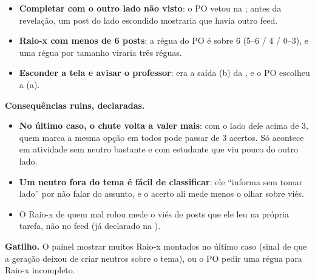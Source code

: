 \begin{itemize}
  \item \textbf{Completar com o outro lado não visto}: o PO vetou na
    ; antes da revelação, um post do lado escondido mostraria
    que havia outro feed.
  \item \textbf{Raio-x com menos de 6 posts}: a régua do PO é sobre 6
    (5--6 / 4 / 0--3), e uma régua por tamanho viraria três réguas.
  \item \textbf{Esconder a tela e avisar o professor}: era a saída (b) da
    , e o PO escolheu a (a).
\end{itemize}

\textbf{Consequências ruins, declaradas.}

\begin{itemize}
  \item \textbf{No último caso, o chute volta a valer mais}: com o lado dele
    acima de 3, quem marca a mesma opção em todos pode passar de 3 acertos.
    Só acontece em atividade sem neutro bastante e com estudante que viu
    pouco do outro lado.
  \item \textbf{Um neutro fora do tema é fácil de classificar}: ele
    \enquote{informa sem tomar lado} por não falar do assunto, e o acerto ali
    mede menos o olhar sobre viés.
  \item O Raio-x de quem mal rolou mede o viés de posts que ele leu na
    própria tarefa, não no feed (já declarado na ).
\end{itemize}

\textbf{Gatilho.} O painel mostrar muitos Raio-x montados no último caso
(sinal de que a geração deixou de criar neutros sobre o tema), ou o PO pedir
uma régua para Raio-x incompleto.
